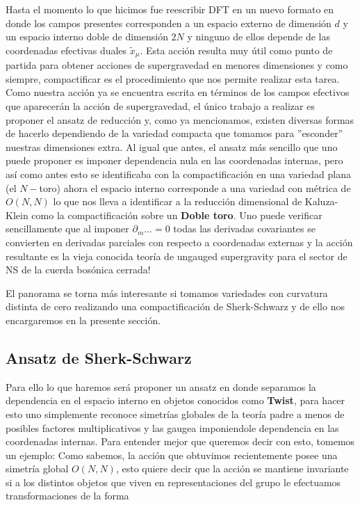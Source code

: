 \documentclass{article}
\numberwithin{equation}{section}
\begin{document}
Hasta el momento lo que hicimos fue reescribir DFT en un nuevo formato en donde los campos presentes corresponden a un espacio externo de dimensión $ d $ y un espacio interno doble de dimensión $ 2N $ y ninguno de ellos depende de las coordenadas efectivas duales $ \widetilde{x}_{\mu} $. Esta acción resulta muy útil como punto de partida para obtener acciones de supergravedad en menores dimensiones y como siempre, compactificar es el procedimiento que nos permite realizar esta tarea. Como nuestra acción ya se encuentra escrita en términos de los campos efectivos que aparecerán la acción de supergravedad, el único trabajo a realizar es proponer el ansatz de reducción y, como ya mencionamos, existen diversas formas de hacerlo dependiendo de la variedad compacta que tomamos para ''esconder'' nuestras dimensiones extra. Al igual que antes, el ansatz más sencillo que uno puede proponer es imponer dependencia nula en las coordenadas internas, pero así como antes esto se identificaba con la compactificación en una variedad plana (el $ N-$toro) ahora el espacio interno corresponde a una variedad con métrica de $ O(N,N) $ lo que nos lleva a identificar a la reducción dimensional de Kaluza-Klein como la compactificación sobre un \textbf{Doble toro}. Uno puede verificar sencillamente que al imponer $ \partial_m \dots =0 $ todas las derivadas covariantes se convierten en derivadas parciales con respecto a coordenadas externas y la acción resultante es la vieja conocida teoría de ungauged supergravity para el sector de NS de la cuerda bosónica cerrada!

El panorama se torna más interesante si tomamos variedades con curvatura distinta de cero realizando una compactificación de Sherk-Schwarz y de ello nos encargaremos en la presente sección.


\subsection{Ansatz de Sherk-Schwarz}

Para ello lo que haremos será proponer un ansatz en donde separamos la dependencia en el espacio interno en objetos conocidos como \textbf{Twist}, para hacer esto uno simplemente reconoce simetrías globales de la teoría padre a menos de posibles factores multiplicativos y las gaugea imponiendole dependencia en las coordenadas internas. Para entender mejor que queremos decir con esto, tomemos un ejemplo: Como sabemos, la acción que obtuvimos recientemente posee una simetría global $ O(N,N) $, esto quiere decir que la acción se mantiene invariante si a los distintos objetos que viven en representaciones del grupo le efectuamos transformaciones de la forma
\end{document}
